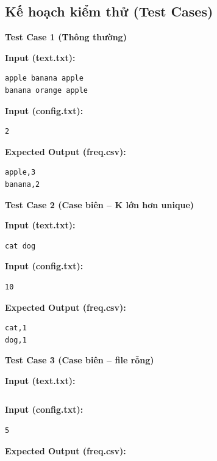 \subsection{Kế hoạch kiểm thử (Test Cases)}

\textbf{Test Case 1 (Thông thường)}

\textbf{Input (text.txt):}

\begin{lstlisting}
apple banana apple
banana orange apple
\end{lstlisting}

\textbf{Input (config.txt):}

\begin{lstlisting}
2
\end{lstlisting}

\textbf{Expected Output (freq.csv):}

\begin{lstlisting}
apple,3
banana,2
\end{lstlisting}

\vspace{0.5cm}

\textbf{Test Case 2 (Case biên -- K lớn hơn unique)}

\textbf{Input (text.txt):}

\begin{lstlisting}
cat dog
\end{lstlisting}

\textbf{Input (config.txt):}

\begin{lstlisting}
10
\end{lstlisting}

\textbf{Expected Output (freq.csv):}

\begin{lstlisting}
cat,1
dog,1
\end{lstlisting}

\vspace{0.5cm}

\textbf{Test Case 3 (Case biên -- file rỗng)}

\textbf{Input (text.txt):}

\begin{lstlisting}

\end{lstlisting}

\textbf{Input (config.txt):}

\begin{lstlisting}
5
\end{lstlisting}

\textbf{Expected Output (freq.csv):}

\begin{lstlisting}

\end{lstlisting}